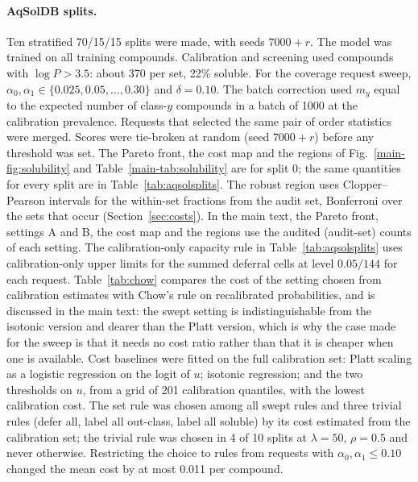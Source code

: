 \documentclass[10pt]{article}
\begin{document}




\paragraph{AqSolDB splits.} Ten stratified 70/15/15 splits were made, with seeds $7000+r$. The model was trained on all training compounds. Calibration and screening used compounds with $\log P>3.5$: about 370 per set, 22\% soluble. For the coverage request sweep, $\alpha_0,\alpha_1\in\{0.025,0.05,\dots,0.30\}$ and $\delta=0.10$. The batch correction used $m_y$ equal to the expected number of class-$y$ compounds in a batch of 1000 at the calibration prevalence. Requests that selected the same pair of order statistics were merged. Scores were tie-broken at random (seed $7000+r$) before any threshold was set. The Pareto front, the cost map and the regions of Fig.~\ref{main-fig:solubility} and Table~\ref{main-tab:solubility} are for split 0; the same quantities for every split are in Table~\ref{tab:aqsolsplits}. The robust region uses Clopper--Pearson intervals for the within-set fractions from the audit set, Bonferroni over the sets that occur (Section~\ref{sec:costs}). In the main text, the Pareto front, settings A and B, the cost map and the regions use the audited (audit-set) counts of each setting. The calibration-only capacity rule in Table~\ref{tab:aqsolsplits} uses calibration-only upper limits for the summed deferral cells at level $0.05/144$ for each request. Table~\ref{tab:chow} compares the cost of the setting chosen from calibration estimates with Chow's rule on recalibrated probabilities, and is discussed in the main text: the swept setting is indistinguishable from the isotonic version and dearer than the Platt version, which is why the case made for the sweep is that it needs no cost ratio rather than that it is cheaper when one is available. Cost baselines were fitted on the full calibration set: Platt scaling as a logistic regression on the logit of $u$; isotonic regression; and the two thresholds on $u$, from a grid of 201 calibration quantiles, with the lowest calibration cost. The set rule was chosen among all swept rules and three trivial rules (defer all, label all out-class, label all soluble) by its cost estimated from the calibration set; the trivial rule was chosen in 4 of 10 splits at $\lambda=50$, $\rho=0.5$ and never otherwise. Restricting the choice to rules from requests with $\alpha_0,\alpha_1\le0.10$ changed the mean cost by at most 0.011 per compound.
\end{document}
